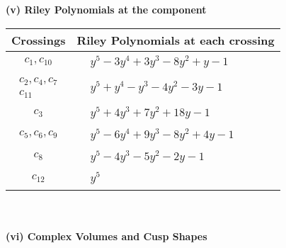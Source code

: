 \documentclass[1p]{elsarticle_modified}
\theoremstyle{definition}
\begin{document}
\newpage\renewcommand{\arraystretch}{1}
\flushleft \textbf{(v) Riley Polynomials at the component}\newline \\
\begin{tabular}{m{50pt}|m{274pt}}
Crossings & \hspace{64pt}Riley Polynomials at each crossing \\
\hline $$\begin{aligned}c_{1},c_{10}\end{aligned}$$&$\begin{aligned}
&y^5-3 y^4+3 y^3-8 y^2+y-1
\end{aligned}$\\
\hline $$\begin{aligned}c_{2},c_{4},c_{7}\\c_{11}\end{aligned}$$&$\begin{aligned}
&y^5+y^4- y^3-4 y^2-3 y-1
\end{aligned}$\\
\hline $$\begin{aligned}c_{3}\end{aligned}$$&$\begin{aligned}
&y^5+4 y^3+7 y^2+18 y-1
\end{aligned}$\\
\hline $$\begin{aligned}c_{5},c_{6},c_{9}\end{aligned}$$&$\begin{aligned}
&y^5-6 y^4+9 y^3-8 y^2+4 y-1
\end{aligned}$\\
\hline $$\begin{aligned}c_{8}\end{aligned}$$&$\begin{aligned}
&y^5-4 y^3-5 y^2-2 y-1
\end{aligned}$\\
\hline $$\begin{aligned}c_{12}\end{aligned}$$&$\begin{aligned}
&y^5
\end{aligned}$\\
\hline
\end{tabular}\\~\\
\newpage\flushleft \textbf{(vi) Complex Volumes and Cusp Shapes}
\end{document}
